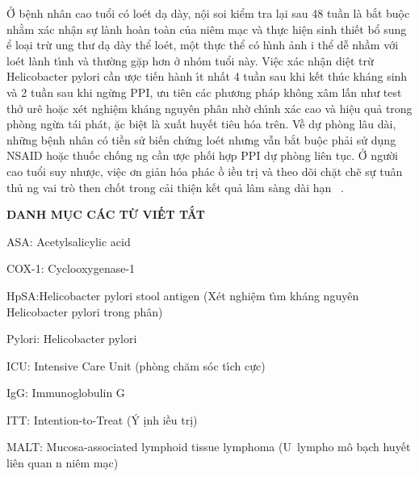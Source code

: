 \documentclass[9pt,twocolumn]{article}
\begin{document}
Ở b{\^{\d{e}}}nh nh\^{a}n cao tuổi c{\'{o}} lo{\'e}t d{\d{a}} d\`{a}y, n{\^{\d{o}}}i soi kiểm tra l{\d{a}}i sau 4{\textendash}8 tuần l\`{a} bắt bu{\^{\d{o}}}c nhằm x\'{a}c nh{\^{\d{a}}}n sự l\`{a}nh ho\`{a}n to\`{a}n của ni{\^{e}}m m{\d{a}}c v\`{a} thực hi{\^{\d{e}}}n sinh thi{{\'{\^{e}}}}t bổ sung \text{\dj}ể lo{\d{a}}i trừ ung thư d{\d{a}} d\`{a}y thể lo{\'e}t, m{\^{\d{o}}}t thực thể c{\'{o}} h\`{\i}nh ảnh i thể d{\~{\^e}} nhầm với lo{\'e}t l\`{a}nh t\'{\i}nh v\`{a} thường gặp hơn ở nh{\'{o}}m tuổi n\`{a}y. Vi{\^{\d{e}}}c x\'{a}c nh{\^{\d{a}}}n di{\^{\d{e}}}t trừ Helicobacter pylori cần \text{\dj}ược ti{{\'{\^{e}}}}n h\`{a}nh \'{\i}t nhất 4 tuần sau khi k{{\'{\^{e}}}}t th\'{u}c kh\'{a}ng sinh v\`{a} 2 tuần sau khi ngừng PPI, ưu ti{\^{e}}n c\'{a}c phương ph\'{a}p kh{\^o}ng x\^{a}m lấn như test thở ur{\^{e}} hoặc x{\'e}t nghi{\^{\d{e}}}m kh\'{a}ng nguy{\^{e}}n ph\^{a}n nhờ  ch\'{\i}nh x\'{a}c cao v\`{a} hi{\^{\d{e}}}u quả trong ph\`{o}ng ngừa t\'{a}i ph\'{a}t, \text{\dj}ặc bi{\^{\d{e}}}t l\`{a} xuất huy{{\'{\^{e}}}}t ti{\^{e}}u h{\'{o}}a tr{\^{e}}n. Về dự ph\`{o}ng l\^{a}u d\`{a}i, những b{\^{\d{e}}}nh nh\^{a}n c{\'{o}} tiền sử bi{{\'{\^{e}}}}n chứng lo{\'e}t nhưng vẫn bắt bu{\^{\d{o}}}c phải sử d\d{u}ng NSAID hoặc thuốc chống ng cần \text{\dj}ược phối hợp PPI dự ph\`{o}ng li{\^{e}}n t\d{u}c. Ở người cao tuổi suy nhược, vi{\^{\d{e}}}c \text{\dj}ơn giản h{\'{o}}a ph\'{a}c \text{\dj}ồ \text{\dj}iều tr\d{i} v\`{a} theo d{\~{o}}i chặt chẽ sự tu\^{a}n thủ ng vai tr\`{o} then chốt trong cải thi{\^{\d{e}}}n k{{\'{\^{e}}}}t quả l\^{a}m s\`{a}ng d\`{a}i h{\d{a}}n\unskip~\cite{2901310:34531807,2901310:34531808,2901310:34531813,2901310:34531815,2901310:34531814,2901310:34531818} .

\textbf{DANH M\d{U}C C\'{A}C TỪ VIẾT TẮT}

ASA: Acetylsalicylic acid

COX-1: Cyclooxygenase-1

HpSA:\textbf{\space }Helicobacter pylori stool antigen (X{\'e}t nghi{\^{\d{e}}}m t\`{\i}m kh\'{a}ng nguy{\^{e}}n Helicobacter pylori trong ph\^{a}n)

Pylori: Helicobacter pylori

ICU: Intensive Care Unit (ph\`{o}ng ch{\u{a}}m s{\'{o}}c t\'{\i}ch cực)

IgG: Immunoglobulin G

ITT: Intention-to-Treat (\'{Y} \text{\dj}\d{i}nh \text{\dj}iều tr\d{i})

MALT: Mucosa-associated lymphoid tissue lymphoma (U~lympho m{\^o} b{\d{a}}ch huy{{\'{\^{e}}}}t li{\^{e}}n quan n ni{\^{e}}m m{\d{a}}c)
\end{document}
